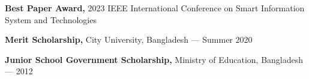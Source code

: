 \begin{cvlistsection}
\item \textbf{Best Paper Award,} 2023 IEEE International Conference on Smart Information System and Technologies
\item \textbf{Merit Scholarship,} City University, Bangladesh — Summer 2020
\item \textbf{Junior School Government Scholarship,} Ministry of Education, Bangladesh — 2012
\end{cvlistsection}
